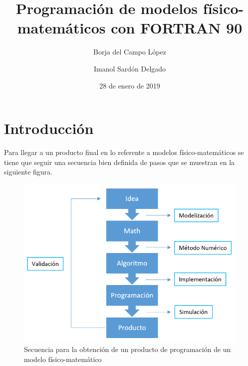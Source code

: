 \documentclass{article}
\title{\Huge{Programación de modelos físico-matemáticos con FORTRAN 90}}
\author{Borja del Campo López \and Imanol Sardón Delgado}
\date{28 de enero de 2019}
\begin{document}
	
	\maketitle
	\thispagestyle{empty}
%	
	\newpage
	\tableofcontents
	\newpage
	
	\section{Introducción}
	
	Para llegar a un producto final en lo referente a modelos físico-matemáticos se tiene que seguir una secuencia bien definida de pasos que se muestran en la siguiente figura.
	
	\begin{figure}[h!]
		\begin{center}
			\includegraphics[scale=0.7]{sequence.png}
			\caption{Secuencia para la obtención de un producto de programación de un modelo físico-matemático}
		\end{center}
	\end{figure}
\end{document}
